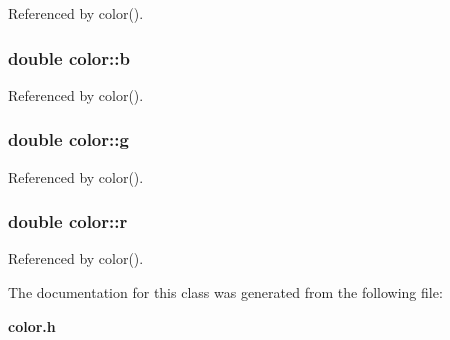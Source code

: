 Referenced by color().
\subsubsection[{b}]{\setlength{\rightskip}{0pt plus 5cm}double {\bf color::b}}\label{classcolor_bcdb38440689f11a57906016c30db0fa}




Referenced by color().
\subsubsection[{g}]{\setlength{\rightskip}{0pt plus 5cm}double {\bf color::g}}\label{classcolor_b8d0eace02390e6d8ff451010331f0f1}




Referenced by color().
\subsubsection[{r}]{\setlength{\rightskip}{0pt plus 5cm}double {\bf color::r}}\label{classcolor_165fe0ed6433017b284aef5c2e8e5c0b}




Referenced by color().

The documentation for this class was generated from the following file:\begin{CompactItemize}
\item 
{\bf color.h}\end{CompactItemize}
